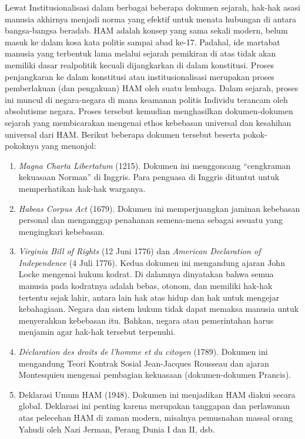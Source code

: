 \documentclass[10pt,a4paper]{article}
\def\tightlist{}
\begin{document}
\begin{multicols}{2}
Lewat Institusionalisasi dalam berbagai beberapa dokumen sejarah,
hak-hak asasi manusia akhirnya menjadi norma yang efektif untuk menata
hubungan di antara bangsa-bangsa beradab. HAM adalah konsep yang sama
sekali modern, belum masuk ke dalam kosa kata politis sampai abad ke-17.
Padahal, ide martabat manusia yang terbentuk lama melalui sejarah
pemikiran di atas tidak akan memiliki dasar realpolitik kecuali
dijangkarkan di dalam konstitusi. Proses penjangkaran ke dalam
konstitusi atau institusionalisasi merupakan proses pemberlakuan (dan
pengakuan) HAM oleh suatu lembaga. Dalam sejarah, proses ini muncul di
negara-negara di mana keamanan politis Individu terancam oleh
absolutisme negara. Proses tersebut kemudian menghasilkan
dokumen-dokumen sejarah yang membicarakan mengenai ethos kebebasan
universal dan kesahihan universal dari HAM. Berikut beberapa dokumen
tersebut beserta pokok-pokoknya yang menonjol:

\begin{enumerate}
\def\labelenumi{\arabic{enumi}.}
\tightlist
\item
  \emph{Magna Charta Libertatum} (1215). Dokumen ini menggoncang
  ``cengkraman kekuasaan Norman'' di Inggris. Para penguasa di Inggris
  dituntut untuk memperhatikan hak-hak warganya.
\item
  \emph{Habeas Corpus Act} (1679). Dokumen ini memperjuangkan jaminan
  kebebasan personal dan menganggap penahanan semena-mena sebagai
  sesuatu yang mengingkari kebebasan.
\item
  \emph{Virginia Bill of Rights} (12 Juni 1776) dan \emph{American
  Declaration of Independence} (4 Juli 1776). Kedua dokumen ini
  mengandung ajaran John Locke mengenai hukum kodrat. Di dalamnya
  dinyatakan bahwa semua manusia pada kodratnya adalah bebas, otonom,
  dan memiliki hak-hak tertentu sejak lahir, antara lain hak atas hidup
  dan hak untuk mengejar kebahagiaan. Negara dan sistem hukum tidak
  dapat memaksa manusia untuk menyerahkan kebebasan itu. Bahkan, negara
  atau pemerintahan harus menjamin agar hak-hak tersebut terpenuhi.
\item
  \emph{Déclaration des droits de l'homme et du citoyen} (1789). Dokumen
  ini mengandung Teori Kontrak Sosial Jean-Jacques Rousseau dan ajaran
  Montesquieu mengenai pembagian kekuasaan (dokumen-dokumen Prancis).
\item
  Deklarasi Umum HAM (1948). Dokumen ini menjadikan HAM diakui secara
  global. Deklarasi ini penting karena merupakan tanggapan dan
  perlawanan atas pelecehan HAM di zaman modern, misalnya pemusnahan
  massal orang Yahudi oleh Nazi Jerman, Perang Dunia I dan II, dsb.
\end{enumerate}


\end{multicols}
\end{document}
